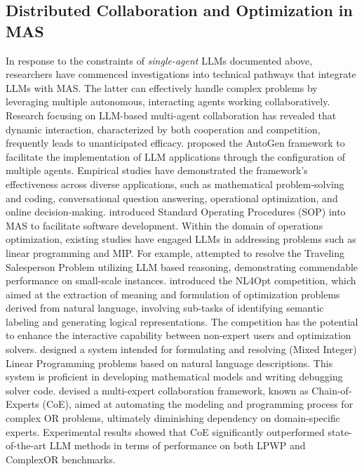 \documentclass[preprint,12pt]{elsarticle}
\begin{document}
\subsection{Distributed Collaboration and Optimization in MAS}

In response to the constraints of \emph{single-agent} LLMs documented above, researchers have commenced investigations into technical pathways that integrate LLMs with MAS. The latter can effectively handle complex problems by leveraging multiple autonomous, interacting agents working collaboratively. Research focusing on LLM-based multi-agent collaboration has revealed that dynamic interaction, characterized by both cooperation and competition, frequently leads to unanticipated efficacy. \citet{wuAutoGenEnablingNextGen2024} proposed the AutoGen framework to facilitate the implementation of LLM applications through the configuration of multiple agents. Empirical studies have demonstrated the framework's effectiveness across diverse applications, such as mathematical problem-solving and coding, conversational question answering, operational optimization, and online decision-making. \citet{hongMetaGPTMetaProgramming2023a} introduced Standard Operating Procedures (SOP) into MAS to facilitate software development. Within the domain of operations optimization, existing studies have engaged LLMs in addressing problems such as linear programming and MIP. For example, \citet{zhangNeuralTSPSolver2023} attempted to resolve the Traveling Salesperson Problem utilizing LLM based reasoning, demonstrating commendable performance on small-scale instances. \citet{ramamonjisonNL4OptCompetitionFormulating2023} introduced the NL4Opt competition, which aimed at the extraction of meaning and formulation of optimization problems derived from natural language, involving sub-tasks of identifying semantic labeling and generating logical representations. The competition has the potential to enhance the interactive capability between non-expert users and optimization solvers. \citet{ahmaditeshniziOptiMUSScalableOptimization2024b} designed a system intended for formulating and resolving (Mixed Integer) Linear Programming problems based on natural language descriptions. This system is proficient in developing mathematical models and writing debugging solver code. \citet{xiaoChainofExpertsWhenLLMs2023} devised a multi-expert collaboration framework, known as Chain-of-Experts (CoE), aimed at automating the modeling and programming process for complex OR problems, ultimately diminishing dependency on domain-specific experts. Experimental results showed that CoE significantly outperformed state-of-the-art LLM methods in terms of performance on both LPWP and ComplexOR benchmarks.
\end{document}
